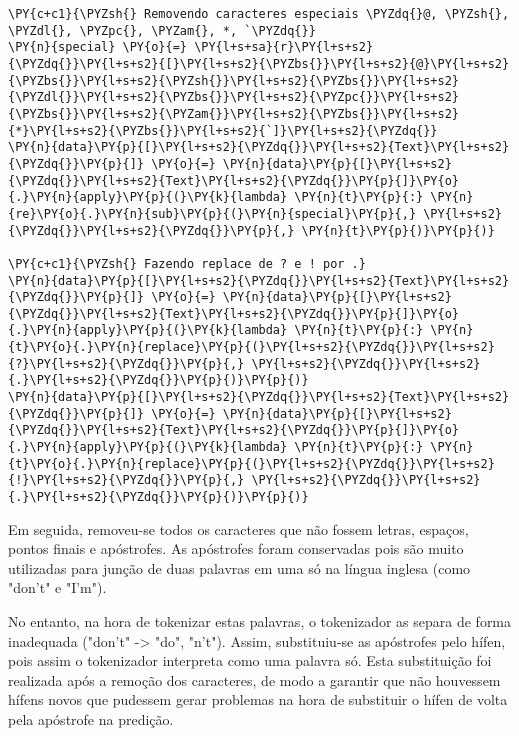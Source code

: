 \documentclass[a4paper,11pt,final]{article}
\begin{document}
\begin{Verbatim}[commandchars=\\\{\},frame=single,fontsize=\small, xleftmargin=0.5em]
\PY{c+c1}{\PYZsh{} Removendo caracteres especiais \PYZdq{}@, \PYZsh{}, \PYZdl{}, \PYZpc{}, \PYZam{}, *, `\PYZdq{}}
\PY{n}{special} \PY{o}{=} \PY{l+s+sa}{r}\PY{l+s+s2}{\PYZdq{}}\PY{l+s+s2}{[}\PY{l+s+s2}{\PYZbs{}}\PY{l+s+s2}{@}\PY{l+s+s2}{\PYZbs{}}\PY{l+s+s2}{\PYZsh{}}\PY{l+s+s2}{\PYZbs{}}\PY{l+s+s2}{\PYZdl{}}\PY{l+s+s2}{\PYZbs{}}\PY{l+s+s2}{\PYZpc{}}\PY{l+s+s2}{\PYZbs{}}\PY{l+s+s2}{\PYZam{}}\PY{l+s+s2}{\PYZbs{}}\PY{l+s+s2}{*}\PY{l+s+s2}{\PYZbs{}}\PY{l+s+s2}{`]}\PY{l+s+s2}{\PYZdq{}}
\PY{n}{data}\PY{p}{[}\PY{l+s+s2}{\PYZdq{}}\PY{l+s+s2}{Text}\PY{l+s+s2}{\PYZdq{}}\PY{p}{]} \PY{o}{=} \PY{n}{data}\PY{p}{[}\PY{l+s+s2}{\PYZdq{}}\PY{l+s+s2}{Text}\PY{l+s+s2}{\PYZdq{}}\PY{p}{]}\PY{o}{.}\PY{n}{apply}\PY{p}{(}\PY{k}{lambda} \PY{n}{t}\PY{p}{:} \PY{n}{re}\PY{o}{.}\PY{n}{sub}\PY{p}{(}\PY{n}{special}\PY{p}{,} \PY{l+s+s2}{\PYZdq{}}\PY{l+s+s2}{\PYZdq{}}\PY{p}{,} \PY{n}{t}\PY{p}{)}\PY{p}{)}

\PY{c+c1}{\PYZsh{} Fazendo replace de ? e ! por .}
\PY{n}{data}\PY{p}{[}\PY{l+s+s2}{\PYZdq{}}\PY{l+s+s2}{Text}\PY{l+s+s2}{\PYZdq{}}\PY{p}{]} \PY{o}{=} \PY{n}{data}\PY{p}{[}\PY{l+s+s2}{\PYZdq{}}\PY{l+s+s2}{Text}\PY{l+s+s2}{\PYZdq{}}\PY{p}{]}\PY{o}{.}\PY{n}{apply}\PY{p}{(}\PY{k}{lambda} \PY{n}{t}\PY{p}{:} \PY{n}{t}\PY{o}{.}\PY{n}{replace}\PY{p}{(}\PY{l+s+s2}{\PYZdq{}}\PY{l+s+s2}{?}\PY{l+s+s2}{\PYZdq{}}\PY{p}{,} \PY{l+s+s2}{\PYZdq{}}\PY{l+s+s2}{.}\PY{l+s+s2}{\PYZdq{}}\PY{p}{)}\PY{p}{)}
\PY{n}{data}\PY{p}{[}\PY{l+s+s2}{\PYZdq{}}\PY{l+s+s2}{Text}\PY{l+s+s2}{\PYZdq{}}\PY{p}{]} \PY{o}{=} \PY{n}{data}\PY{p}{[}\PY{l+s+s2}{\PYZdq{}}\PY{l+s+s2}{Text}\PY{l+s+s2}{\PYZdq{}}\PY{p}{]}\PY{o}{.}\PY{n}{apply}\PY{p}{(}\PY{k}{lambda} \PY{n}{t}\PY{p}{:} \PY{n}{t}\PY{o}{.}\PY{n}{replace}\PY{p}{(}\PY{l+s+s2}{\PYZdq{}}\PY{l+s+s2}{!}\PY{l+s+s2}{\PYZdq{}}\PY{p}{,} \PY{l+s+s2}{\PYZdq{}}\PY{l+s+s2}{.}\PY{l+s+s2}{\PYZdq{}}\PY{p}{)}\PY{p}{)}
\end{Verbatim}


Em seguida, removeu-se todos os caracteres que não fossem letras, espaços, pontos finais e apóstrofes.
As apóstrofes foram conservadas pois são muito utilizadas para junção de duas palavras em uma só na língua inglesa (como "don't" e "I'm").

No entanto, na hora de tokenizar estas palavras, o tokenizador as separa de forma inadequada ("don't" -> "do", "n't").
Assim, substituiu-se as apóstrofes pelo hífen, pois assim o tokenizador interpreta como uma palavra só. 
Esta substituição foi realizada após a remoção dos caracteres, de modo a garantir que não houvessem hífens novos que pudessem gerar problemas na hora de substituir o hífen de volta pela apóstrofe na predição.
\end{document}
